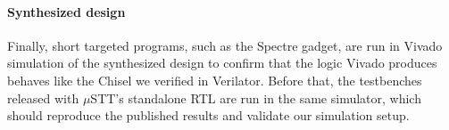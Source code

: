 
\paragraph{Synthesized design}
Finally, short targeted programs, such as the Spectre gadget, are run in Vivado
simulation of the synthesized design to confirm that the logic Vivado
produces behaves like the Chisel we verified in Verilator. Before that, the
testbenches released with $\mu$STT's standalone RTL are run in the same
simulator, which should reproduce the published results and validate our
simulation setup.
